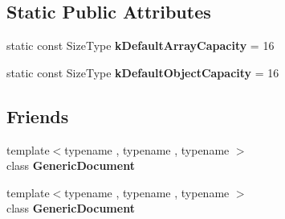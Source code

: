 \subsection*{Static Public Attributes}
\begin{DoxyCompactItemize}
\item 
static const Size\+Type {\bfseries k\+Default\+Array\+Capacity} = 16\hypertarget{class_generic_value_a622378eb37d924cefac4c2d6aba9c6e3}{}\label{class_generic_value_a622378eb37d924cefac4c2d6aba9c6e3}

\item 
static const Size\+Type {\bfseries k\+Default\+Object\+Capacity} = 16\hypertarget{class_generic_value_a958912faeb465899d4d358bb1d87fa2c}{}\label{class_generic_value_a958912faeb465899d4d358bb1d87fa2c}

\end{DoxyCompactItemize}
\subsection*{Friends}
\begin{DoxyCompactItemize}
\item 
{\footnotesize template$<$typename , typename , typename $>$ }\\class {\bfseries Generic\+Document}\hypertarget{class_generic_value_ab05bc9e52e201a2867ea5bac141ee1ae}{}\label{class_generic_value_ab05bc9e52e201a2867ea5bac141ee1ae}

\item 
{\footnotesize template$<$typename , typename , typename $>$ }\\class {\bfseries Generic\+Document}\hypertarget{class_generic_value_a5f64f6939104d4fba0885b2f5f03f14a}{}\label{class_generic_value_a5f64f6939104d4fba0885b2f5f03f14a}

\end{DoxyCompactItemize}
